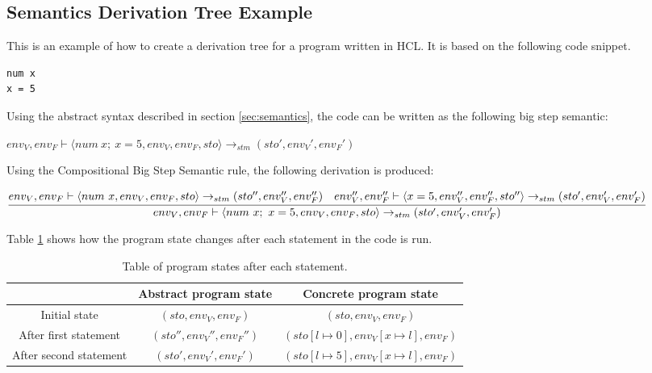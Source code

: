 \begin{landscape}
\section{Semantics Derivation Tree Example}
\label{sec:semanticsTree}
This is an example of how to create a derivation tree for a program written in HCL.
It is based on the following code snippet.

\begin{lstlisting}[language=HCL,label=lis:derivationCode,firstnumber=1]
num x
x = 5
\end{lstlisting}

Using the abstract syntax described in section \ref{sec:semantics}, the code can be written as the following big step semantic:

\begin{center}
	$env_V, env_F \vdash \langle num\ x;\ x = 5, env_V, env_F, sto \rangle \rightarrow_{stm} (sto', env_V', env_F')$
\end{center}
Using the Compositional Big Step Semantic rule, the following derivation is produced:

\begin{center}
	\begin{math}
		\cfrac
		{env_V, env_F \vdash \langle num\ x, env_V, env_F, sto \rangle \rightarrow_{stm} (sto'', env_V'', env_F'')\quad env_V'', env_F'' \vdash \langle x = 5, env_V'', env_F'', sto'' \rangle \rightarrow_{stm} (sto', env_V', env_F')}
		{env_V, env_F \vdash \langle num\ x;\ x = 5, env_V, env_F, sto \rangle \rightarrow_{stm} (sto', env_V', env_F')}
	\end{math}
\end{center}

Table \ref{tbl:progstates} shows how the program state changes after each statement in the code is run.

\begin{table}[H]
	\centering
	\caption{Table of program states after each statement.}
	\label{tbl:progstates}
	\setlength\extrarowheight{5pt}
	\begin{tabular}{|c|c|c|}
		\hline
		& Abstract program state      & Concrete program state                          \\ \hline
		Initial state          & $(sto, env_V, env_F)$       & $(sto, env_V, env_F)$                           \\ \hline
		After first statement  & $(sto'', env_V'', env_F'')$ & $(sto[l \mapsto 0], env_V[x \mapsto l], env_F)$ \\ \hline
		After second statement & $(sto', env_V', env_F')$    & $(sto[l \mapsto 5], env_V[x \mapsto l], env_F)$  \\ \hline
	\end{tabular}
\end{table}

\end{landscape}